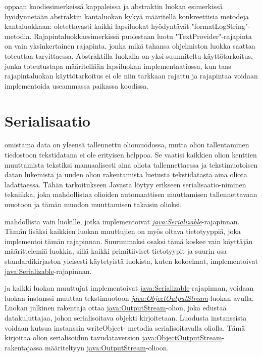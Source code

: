 \documentclass{tufte-book}
\newcommand{\java}[1]{\underline{\gls{java:#1}}}
\newcommand{\newjava}[1]{\textit{\java{#1}}}
\begin{document}
 oppaan koodiesimerkeissä kappaleissa  ja
 abstraktin luokan esimerkissä hyödynnetään abstraktin kantaluokan kykyä
määritellä konkreettisia metodeja kantaluokkaan: oletettavasti kaikki lapsiluokat hyödyntävät
"formatLogString"-metodia. Rajapintaluokkaesimerkissä puolestaan luotu "TextProvider"-rajapinta
on vain yksinkertainen rajapinta, jonka mikä tahansa ohjelmiston luokka saattaa toteuttaa
tarvittaessa. Abstraktilla luokalla on yksi suunniteltu käyttötarkoitus, jonka toteutustapa
määritellään lapsiluokan implementaatiossa, kun taas rajapintaluokan käyttötarkoitus ei ole niin
tarkkaan rajattu ja rajapintaa voidaan implementoida useammassa paikassa koodissa.


\section{Serialisaatio}
\label{serialisaatio}

 omistama data on yleensä tallennettu oliomuodossa, mutta olion
tallentaminen tiedostoon tekstidatana ei ole erityisen helppoa. Se vaatisi kaikkien olion kenttien
muuttamista tekstiksi manuaalisesti aina oliota tallennettaessa ja tekstimuotoisen datan lukemista
ja uuden olion rakentamista luetusta tekstidatasta aina oliota ladattaessa. Tähän tarkoitukseen
Javasta löytyy erikseen \gls{serialisaatio}-niminen tekniikka, joka mahdollistaa olioiden
automaattisen muuttamisen tallennettavaan muotoon ja tämän muodon muuttamisen takaisin olioksi.

 mahdollista vain luokille, jotka implementoivat
\newjava{Serializable}-rajapinnan. Tämän lisäksi kaikkien luokan muuttujien on myös oltava
tietotyyppiä, joka implementoi tämän rajapinnan. Suurimmaksi osaksi tämä koskee vain käyttäjän
määrittelemiä luokkia, sillä kaikki primitiiviset tietotyypit ja suurin osa standardikirjaston
yleisesti käytetyistä luokista, kuten kokoelmat, implementoivat \java{Serializable}-rajapinnan.

 ja kaikki luokan muuttujat implementoivat \java{Serializable}-rajapinnan,
voidaan luokan instanssi muuttaa tekstimuotoon \newjava{ObjectOutputStream}-luokan avulla.
Luokan julkinen rakentaja ottaa \java{OutputStream}-olion, joka edustaa datakuluttajaa, johon
serialisoitava objekti kirjoitetaan. Luodusta instanssista voidaan kutsua instanssin writeObject-
metodia serialisoitavalla oliolla. Tämä kirjoitaa olion serialisoidun tavudataversion
\java{ObjectOutputStream}-rakentajassa määriteltyyn \java{OutputStream}-olioon.
\end{document}
